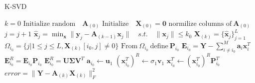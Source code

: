 \begin{algorithm}[H]
\caption{K-SVD}
\begin{algorithmic}[1]
			\State$k = 0$			
			\State$\text{Initialize random} \quad  \textbf{A}_{(0)}$            
			\State$\text{Initialize} \quad \textbf{X}_{(0)}=\mathbf{0}$
			\State
            \State$\text{normilize columns of} \ \textbf{A}_{(0)}$
                \State $j = j+1$
                 
                	\State$\hat{\textbf{x}}_{j} = \min_{\textbf{x}} \|\textbf{y}_j -\textbf{A}_{(k-1)}\textbf{x}_{j}\| \quad s.t. \quad \|\textbf{x}_{j}\| \leq k_0 $
				\EndFor
				\State$\textbf{X}_{(k)}=\{\hat{\textbf{x}}_{j}\}_{j=1}^{L}$
					\State$\Omega_{i_0}=\{j|1\leq j \leq L , \textbf{X}_{(k)}[i_0,j]\neq 0\}$
					\State$\text{From} \ \Omega_{i_0} \ \text{define} \ \textbf{P}_{i_0} $
					\State$\textbf{E}_{i_0} =  \textbf{Y}- \sum_{i\neq i_{0}}^{M} \textbf{a}_i\textbf{x}_i^{T}$
					\State$\textbf{E}_{i_0}^R = \textbf{E}_{i_0}\textbf{P}_{i_0}$
					\State$\textbf{E}_{i_0}^R=\textbf{U}\boldsymbol{\Sigma}\textbf{V}^T$ 
					\State$\textbf{a}_{i_0}\gets \textbf{u}_{1}$ 
					\State$\left( \textbf{x}_{i_0}^T\right)^R \gets \sigma_{1}\textbf{v}_{1}$
					\State$\textbf{x}_{i_0}^T \gets \left( \textbf{x}_{i_0}^T\right)^R \textbf{P}_{i_0}^T $ 
				\EndFor
				\State$error =\| \textbf{Y}-\textbf{A}_{(k)}\textbf{X}_{(k)}\|_{F}^2 $
          		\EndWhile
            \EndProcedure
        \end{algorithmic} 
        \label{alg:K_SVD}
\end{algorithm}
